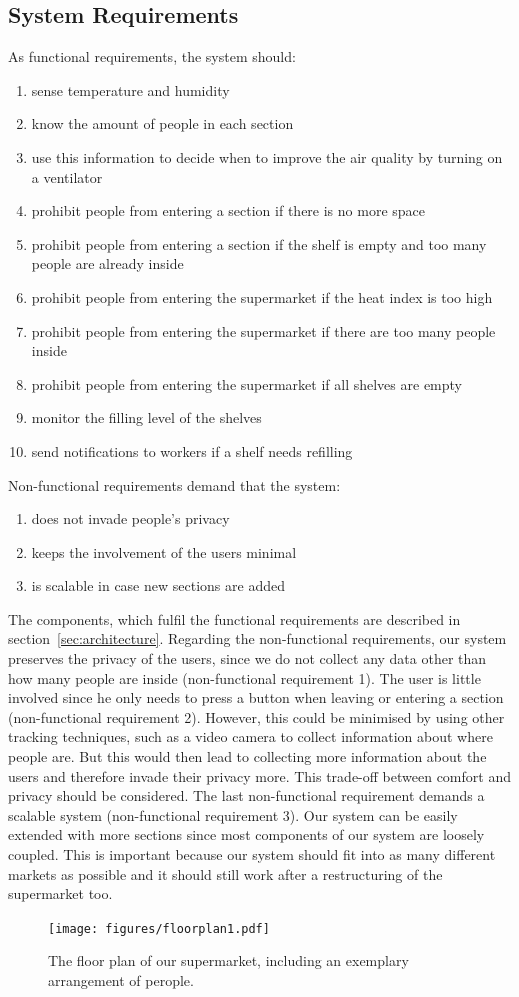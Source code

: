 \documentclass[runningheads]{llncs}
\begin{document}
	\subsection{System Requirements}
	As functional requirements, the system should: 
	\begin{enumerate}
		\item sense temperature and humidity 
		\item know the amount of people in each section
		\item use this information to decide when to improve the air quality by turning on a ventilator
		\item prohibit people from entering a section if there is no more space
		\item prohibit people from entering a section if the shelf is empty and too many people are already inside
		\item prohibit people from entering the supermarket if the heat index is too high
		\item prohibit people from entering the supermarket if there are too many people inside
		\item prohibit people from entering the supermarket if all shelves are empty 
		\item monitor the filling level of the shelves 
		\item send notifications to workers if a shelf needs refilling 
	\end{enumerate}
	Non-functional requirements demand that the system: 
	\begin{enumerate}
		\item does not invade people's privacy 
		\item keeps the involvement of the users minimal 
		\item is scalable in case new sections are added
	\end{enumerate}
	The components, which fulfil the functional requirements are described in section~\ref{sec:architecture}. 
	Regarding the non-functional requirements, our system preserves the privacy of the users, since we do not collect any data other than how many people are inside (non-functional requirement 1).
	The user is little involved since he only needs to press a button when leaving or entering a section (non-functional requirement 2).
	However, this could be minimised by using other tracking techniques, such as a video camera to collect information about where people are. 
	But this would then lead to collecting more information about the users and therefore invade their privacy more. 
	This trade-off between comfort and privacy should be considered. 
	The last non-functional requirement demands a scalable system (non-functional requirement 3).
	Our system can be easily extended with more sections since most components of our system are loosely coupled. 
	This is important because our system should fit into as many different markets as possible and it should still work after a restructuring of the supermarket too.
	\begin{figure}[bt]
		\centering
		\texttt{[image: figures/floorplan1.pdf]}
		\caption{The floor plan of our supermarket, including an exemplary arrangement of perople.}
		\label{fig:floorplan}
	\end{figure}
\end{document}
